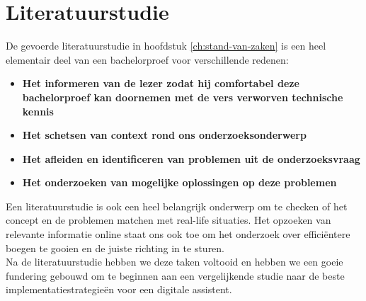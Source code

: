 \chapter{Literatuurstudie}
De gevoerde literatuurstudie in hoofdstuk \ref{ch:stand-van-zaken} is een heel elementair deel van een bachelorproef voor verschillende redenen:

\begin{itemize}
	\item \textbf{Het informeren van de lezer zodat hij comfortabel deze bachelorproef kan doornemen met de vers verworven technische kennis}
	\item \textbf{Het schetsen van context rond ons onderzoeksonderwerp}
	\item \textbf{Het afleiden en identificeren van problemen uit de onderzoeksvraag}
	\item \textbf{Het onderzoeken van mogelijke oplossingen op deze problemen}
\end{itemize}

Een literatuurstudie is ook een heel belangrijk onderwerp om te checken of het concept en de problemen matchen met real-life situaties. 
Het opzoeken van relevante informatie online staat ons ook toe om het onderzoek over efficiëntere boegen te gooien en de juiste richting in te sturen.\\ 

Na de literatuurstudie hebben we deze taken voltooid en hebben we een goeie fundering gebouwd om te beginnen aan een vergelijkende studie naar de beste implementatiestrategieën voor een digitale assistent. 
